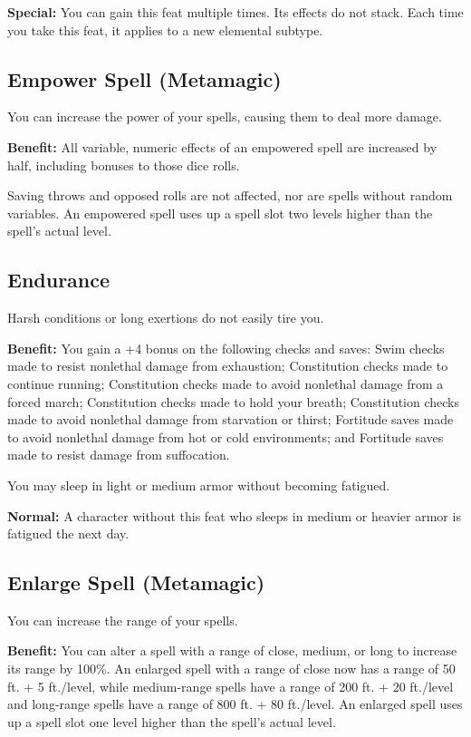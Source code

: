 \textbf{Special:} You can gain this feat multiple times. Its effects do not stack. Each time you take this feat, it applies to a new elemental subtype.
				
\subsection{Empower Spell (Metamagic)}

				
You can increase the power of your spells, causing them to deal more damage.
				
\textbf{Benefit:} All variable, numeric effects of an empowered spell are increased by half, including bonuses to those dice rolls.

Saving throws and opposed rolls are not affected, nor are spells without random variables. An empowered spell uses up a spell slot two levels higher than the spell's actual level.
				
\subsection{Endurance}

				
Harsh conditions or long exertions do not easily tire you.
				
\textbf{Benefit:} You gain a +4 bonus on the following checks and saves: Swim checks made to resist nonlethal damage from exhaustion; Constitution checks made to continue running; Constitution checks made to avoid nonlethal damage from a forced march; Constitution checks made to hold your breath; Constitution checks made to avoid nonlethal damage from starvation or thirst; Fortitude saves made to avoid nonlethal damage from hot or cold environments; and Fortitude saves made to resist damage from suffocation.

You may sleep in light or medium armor without becoming fatigued.
				
\textbf{Normal:} A character without this feat who sleeps in medium or heavier armor is fatigued the next day.
				
\subsection{Enlarge Spell (Metamagic)}

				
You can increase the range of your spells.
				
\textbf{Benefit:} You can alter a spell with a range of close, medium, or long to increase its range by 100\%. An enlarged spell with a range of close now has a range of 50 ft. + 5 ft./level, while medium-range spells have a range of 200 ft. + 20 ft./level and long-range spells have a range of 800 ft. + 80 ft./level. An enlarged spell uses up a spell slot one level higher than the spell's actual level.

